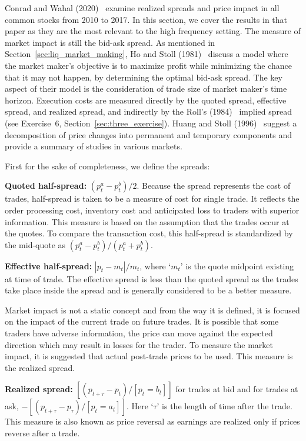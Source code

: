 Conrad and Wahal (2020)~\cite{wahal2020} examine realized spreads and price impact in all common stocks from 2010 to 2017. In this section, we cover the results in that paper as they are the most relevant to the high frequency setting. The measure of market impact is still the bid-ask spread. As mentioned in Section~\ref{sec:liq_market_making}, Ho and Stoll (1981)~\cite{ho1981} discuss a model where the market maker's objective is to maximize profit while minimizing the chance that it may not happen, by determining the optimal bid-ask spread. The key aspect of their model is the consideration of trade size of market maker's time horizon. Execution costs are measured directly by the quoted spread, effective spread, and realized spread, and indirectly by the Roll's (1984)~\cite{roll1984} implied spread (see Exercise~6, Section~\ref{sec:three_exercise}). Huang and Stoll (1996)~\cite{huang_stoll1996} suggest a decomposition of price changes into permanent and temporary components and provide a summary of studies in various markets. 


First for the sake of completeness, we define the spreads: \twomedskip


\noindent\textbf{Quoted half-spread:} $(p_t^a - p_t^b)/2$. Because the spread represents the cost of trades, half-spread is taken to be a measure of cost for single trade. It reflects the order processing cost, inventory cost and anticipated loss to traders with superior information. This measure is based on the assumption that the trades occur at the quotes. To compare the transaction cost, this half-spread is standardized by the mid-quote as $(p_t^a - p_t^b)/ (p_t^a + p_t^b)$.  \twomedskip


\noindent\textbf{Effective half-spread:} $|p_t - m_t|/m_t$, where `$m_t$' is the quote midpoint existing at time of trade. The effective spread is less than the quoted spread as the trades take place inside the spread and is generally considered to be a better measure. 

Market impact is not a static concept and from the way it is defined, it is focused on the impact of the current trade on future trades. It is possible that some traders have adverse information, the price can move against the expected direction which may result in losses for the trader. To measure the market impact, it is suggested that actual post-trade prices to be used. This measure is the realized spread. \twomedskip


\noindent\textbf{Realized spread:} $[(p_{t+ \tau} - p_t)/[p_t= b_t]]$ for trades at bid and for trades at ask, $-[(p_{t+ \tau} - p_\tau)/[p_t= a_t]]$. Here `$\tau$' is the length of time after the trade. This measure is also known as price reversal as earnings are realized only if prices reverse after a trade. \twomedskip


